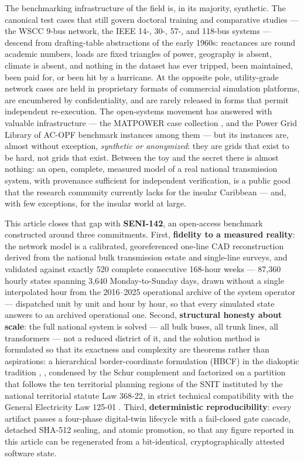 The benchmarking infrastructure of the field is, in its majority, synthetic. The canonical test cases that still govern doctoral training and comparative studies --- the WSCC 9-bus network, the IEEE 14-, 30-, 57-, and 118-bus systems --- descend from drafting-table abstractions of the early 1960s: reactances are round academic numbers, loads are fixed triangles of power, geography is absent, climate is absent, and nothing in the dataset has ever tripped, been maintained, been paid for, or been hit by a hurricane. At the opposite pole, utility-grade network cases are held in proprietary formats of commercial simulation platforms, are encumbered by confidentiality, and are rarely released in forms that permit independent re-execution. The open-systems movement has answered with valuable infrastructure --- the MATPOWER case collection \cite{matpower2011}, and the Power Grid Library of AC-OPF benchmark instances \cite{pglib2019} among them --- but its instances are, almost without exception, \emph{synthetic or anonymized}: they are grids that exist to be hard, not grids that exist. Between the toy and the secret there is almost nothing: an open, complete, measured model of a real national transmission system, with provenance sufficient for independent verification, is a public good that the research community currently lacks for the insular Caribbean --- and, with few exceptions, for the insular world at large.

This article closes that gap with \textbf{SENI-142}, an open-access benchmark constructed around three commitments. First, \textbf{fidelity to a measured reality}: the network model is a calibrated, georeferenced one-line CAD reconstruction derived from the national bulk transmission estate and single-line surveys, and validated against exactly 520 complete consecutive 168-hour weeks --- 87,360 hourly states spanning 3,640 Monday-to-Sunday days, drawn without a single interpolated hour from the 2016--2025 operational archive of the system operator --- dispatched unit by unit and hour by hour, so that every simulated state answers to an archived operational one. Second, \textbf{structural honesty about scale}: the full national system is solved --- all bulk buses, all trunk lines, all transformers --- not a reduced district of it, and the solution method is formulated so that its exactness and complexity are theorems rather than aspirations: a hierarchical border-coordinate formulation (HBCF) in the diakoptic tradition \cite{kron1963}, \cite{happ1971}, condensed by the Schur complement \cite{zhang2005} and factorized on a partition that follows the ten territorial planning regions of the SNIT instituted by the national territorial statute Law 368-22, in strict technical compatibility with the General Electricity Law 125-01 \cite{ley368}. Third, \textbf{deterministic reproducibility}: every artifact passes a four-phase digital-twin lifecycle with a fail-closed gate cascade, detached SHA-512 sealing, and atomic promotion, so that any figure reported in this article can be regenerated from a bit-identical, cryptographically attested software state.

